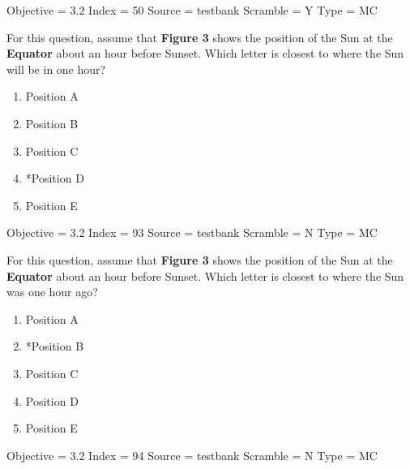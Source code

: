\documentclass[11pt]{article}
\begin{document}
\begin{enumerate}
\begin{minipage}{\textwidth}
\begin{minipage}{\textwidth}
Objective = 3.2
Index = 50
Source = testbank
Scramble = Y
Type = MC
\end{minipage}
\end{minipage}
\vskip 0.20in

\begin{minipage}{\textwidth}
\begin{minipage}{\textwidth}
\item For this question, assume that {\bf Figure 3} shows the position of the Sun at the {\bf Equator} about an hour before Sunset.   Which letter is closest to where the Sun will be in one hour?
\begin{multicols}{3}
\begin{enumerate} 
\setlength{\itemsep}{1pt} 
\setlength{\parskip}{0pt} 
\setlength{\parsep}{0pt}
\setlength{\multicolsep}{1pt} 
\item Position A
\item Position B
\item Position C
\item *Position D
\item Position E
\end{enumerate} 
\vfill 
\end{multicols}

Objective = 3.2
Index = 93
Source = testbank
Scramble = N
Type = MC
\end{minipage}
\end{minipage}
\vskip 0.20in

\begin{minipage}{\textwidth}
\begin{minipage}{\textwidth}
\item For this question, assume that {\bf Figure 3} shows the position of the Sun at the {\bf Equator} about an hour before Sunset.   Which letter is closest to where the Sun was one hour ago?
\begin{multicols}{3}
\begin{enumerate} 
\setlength{\itemsep}{1pt} 
\setlength{\parskip}{0pt} 
\setlength{\parsep}{0pt}
\setlength{\multicolsep}{1pt} 
\item Position A
\item *Position B
\item Position C
\item Position D
\item Position E
\end{enumerate} 
\vfill 
\end{multicols}

Objective = 3.2
Index = 94
Source = testbank
Scramble = N
Type = MC
\end{minipage}
\end{minipage}
\vskip 0.20in


\end{enumerate}
\end{document}
